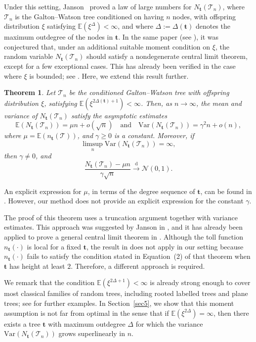 \documentclass[article]{amsart}
\newcommand{\Var} {\mathrm {Var}}
\newcommand{\nc}{\mathcal{N}}
\newcommand{\tc}{\mathcal{T}}
\newcommand{\st}{\textbf{t}}
\newcommand{\N}{N_{\st}}
\newcommand{\n}{n_{\st}}
\newcommand{\E}{\mathbb{E}}
\newcommand\dto{\overset{\mathrm{d}}{\to}}
\newtheorem{theorem}{Theorem}
\theoremstyle{definition}
\theoremstyle{remark}
\begin{document}
Under this setting, Janson~\cite{J21} proved a law of large numbers for $\N(\tc_n)$, where $\tc_n$ is the Galton--Watson tree conditioned on having $n$ nodes, with offspring distribution $\xi$ satisfying $\E(\xi^{\Delta}) < \infty$, and where $\Delta := \Delta(\st)$ denotes the maximum outdegree of the nodes in $\st$. In the same paper (see \cite[Section~5]{J21}), it was conjectured that, under an additional suitable moment condition on $\xi$, the random variable $\N(\tc_n)$ should satisfy a nondegenerate central limit theorem, except for a few exceptional cases. This has already been verified in the case where $\xi$ is bounded; see \cite[Proposition~5.1]{J21}. Here, we extend this result further.
\begin{theorem}\label{main theorem}
Let $\tc_n$ be the conditioned Galton--Watson tree with offspring distribution $\xi$, satisfying $\E(\xi^{2\Delta(\st)+1}) < \infty$. Then, as $n \to \infty$, the mean and variance of $\N(\tc_n)$ satisfy the asymptotic estimates
\[
\mathbb{E}(\N(\tc_n)) = \mu n + o(\sqrt{n})
\quad \text{and} \quad
\Var(\N(\tc_n)) = \gamma^2 n + o(n),
\]
where $\mu = \mathbb{E}(\n(\tc))$, and $\gamma \ge 0$ is a constant. Moreover, if
\[
\limsup_n \Var(\N(\tc_n)) = \infty,
\]
then $\gamma \neq 0$, and
\[
\frac{\N(\tc_n) - \mu n}{\gamma \sqrt{n}} \dto \nc(0,1).
\]
\end{theorem}
An explicit expression for $\mu$, in terms of the degree sequence of $\st$, can be found in \cite[Equation~(3.2)]{J21}. However, our method does not provide an explicit expression for the constant $\gamma$.

The proof of this theorem uses a truncation argument together with variance estimates. This approach was suggested by Janson in \cite{J21}, and it has already been applied to prove a general central limit theorem in \cite[Theorem~1]{ralaivaosaona2020}. Although the toll function $\n(\cdot)$ is local for a fixed $\st$, the result in \cite[Theorem~1]{ralaivaosaona2020} does not apply in our setting because $\n(\cdot)$ fails to satisfy the condition stated in Equation~(2) of that theorem when $\st$ has height at least $2$. Therefore, a different approach is required.

We remark that the condition $\E(\xi^{2\Delta+1}) < \infty$ is already strong enough to cover most classical families of random trees, including rooted labelled trees and plane trees; see \cite{D09} for further examples. In Section~\ref{sec5}, we show that this moment assumption is not far from optimal in the sense that if $\E(\xi^{2\Delta}) = \infty$, then there exists a tree $\st$ with maximum outdegree $\Delta$ for which the variance $\Var(\N(\tc_n))$ grows superlinearly in $n$.
\end{document}
